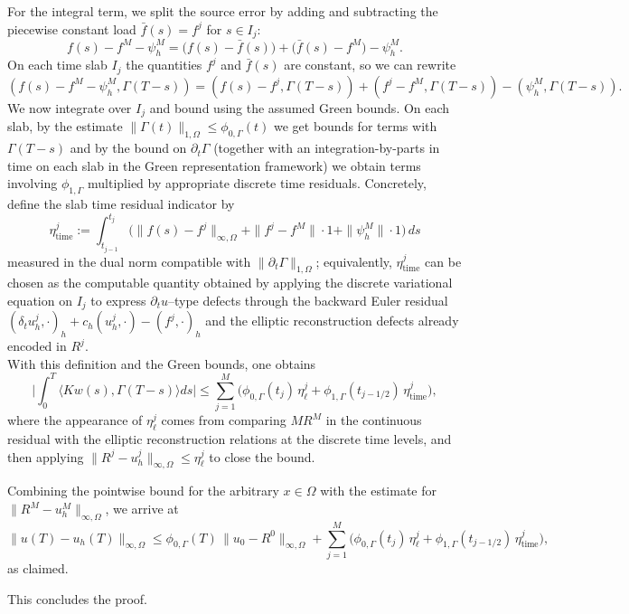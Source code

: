 \documentclass[11pt]{article}
\begin{document}
For the integral term, we split the source error by adding and subtracting the piecewise constant load $\bar f(s)=f^j$ for $s\in I_j$:
\[
f(s)-f^M-\psi_h^M
=\big(f(s)-\bar f(s)\big)+\big(\bar f(s)-f^M\big)-\psi_h^M.
\]
On each time slab $I_j$ the quantities $f^j$ and $\bar f(s)$ are constant, so we can rewrite
\[
(f(s)-f^M-\psi_h^M,\Gamma(T-s))
=(f(s)-f^j,\Gamma(T-s))+(f^j-f^M,\Gamma(T-s))-(\psi_h^M,\Gamma(T-s)).
\]
We now integrate over $I_j$ and bound using the assumed Green bounds. On each slab, by the estimate $\|\Gamma(t)\|_{1,\Omega}\le \phi_{0,\Gamma}(t)$ we get bounds for terms with $\Gamma(T-s)$ and by the bound on $\partial_t\Gamma$ (together with an integration-by-parts in time on each slab in the Green representation framework) we obtain terms involving $\phi_{1,\Gamma}$ multiplied by appropriate discrete time residuals. Concretely, define the slab time residual indicator by
\[
\eta_\mathrm{time}^j
:=\int_{t_{j-1}}^{t_j}\Big(\|f(s)-f^j\|_{\infty,\Omega}+\|f^j-f^M\|\cdot 1+\|\psi_h^M\|\cdot 1\Big)\,ds
\]
measured in the dual norm compatible with $\|\partial_t\Gamma\|_{1,\Omega}$; equivalently, $\eta_\mathrm{time}^j$ can be chosen as the computable quantity obtained by applying the discrete variational equation on $I_j$ to express $\partial_t u$--type defects through the backward Euler residual $(\delta_t u_h^j,\cdot)_h+c_h(u_h^j,\cdot)-(f^j,\cdot)_h$ and the elliptic reconstruction defects already encoded in $R^j$.
\[
\]
With this definition and the Green bounds, one obtains
\[
\Big|\int_0^T \langle Kw(s),\Gamma(T-s)\rangle ds\Big|
\le \sum_{j=1}^M \Big(\phi_{0,\Gamma}(t_j)\,\eta_\ell^j+\phi_{1,\Gamma}(t_{j-1/2})\,\eta_\mathrm{time}^j\Big),
\]
where the appearance of $\eta_\ell^j$ comes from comparing $MR^M$ in the continuous residual with the elliptic reconstruction relations at the discrete time levels, and then applying $\|R^j-u_h^j\|_{\infty,\Omega}\le \eta_\ell^j$ to close the bound.

Combining the pointwise bound for the arbitrary $x\in\Omega$ with the estimate for $\|R^M-u_h^M\|_{\infty,\Omega}$, we arrive at
\[
\|u(T)-u_h(T)\|_{\infty,\Omega}
\le \phi_{0,\Gamma}(T)\,\|u_0-R^0\|_{\infty,\Omega}+\sum_{j=1}^M \Big(\phi_{0,\Gamma}(t_j)\,\eta_\ell^j+\phi_{1,\Gamma}(t_{j-1/2})\,\eta_\mathrm{time}^j\Big),
\]
as claimed.

This concludes the proof.
\end{document}
